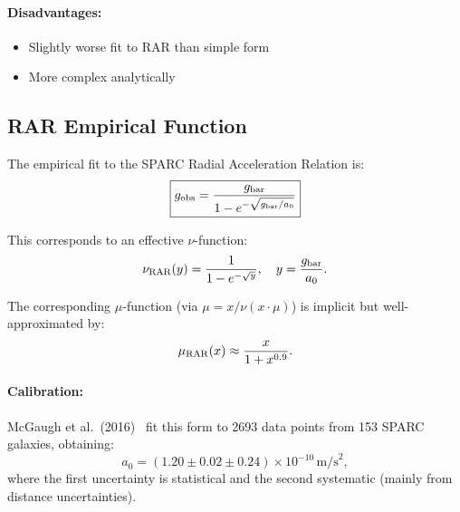 \paragraph{Disadvantages:}
\begin{itemize}
\item Slightly worse fit to RAR than simple form
\item More complex analytically
\end{itemize}

\subsection{RAR Empirical Function}\label{app:mu_rar}

The empirical fit to the SPARC Radial Acceleration Relation is:
\begin{equation}
\boxed{g_{\rm obs} = \frac{g_{\rm bar}}{1 - e^{-\sqrt{g_{\rm bar}/a_0}}}}
\end{equation}

This corresponds to an effective $\nu$-function:
\begin{equation}
\nu_{\rm RAR}(y) = \frac{1}{1 - e^{-\sqrt{y}}}, \quad y = \frac{g_{\rm bar}}{a_0}.
\end{equation}

The corresponding $\mu$-function (via $\mu = x/\nu(x\cdot\mu)$) is implicit 
but well-approximated by:
\begin{equation}
\mu_{\rm RAR}(x) \approx \frac{x}{1 + x^{0.9}}.
\end{equation}

\paragraph{Calibration:} McGaugh et al.\ (2016)~\cite{McGaugh2016} fit this 
form to 2693 data points from 153 SPARC galaxies, obtaining:
\begin{equation}
a_0 = (1.20 \pm 0.02 \pm 0.24) \times 10^{-10}\,\text{m/s}^2,
\end{equation}
where the first uncertainty is statistical and the second systematic 
(mainly from distance uncertainties).

